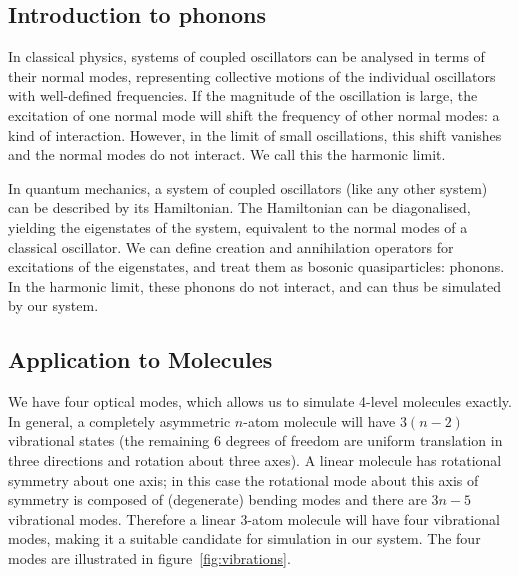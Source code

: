 \subsection{Introduction to phonons}
\label{sec:Phonons}
In classical physics, systems of coupled oscillators can be analysed in terms of
their normal modes, representing collective motions of the individual
oscillators with well-defined frequencies. If the magnitude of the oscillation
is large, the excitation of one normal mode will shift the frequency of other
normal modes: a kind of interaction. However, in the limit of small
oscillations, this shift vanishes and the normal modes do not interact. We call
this the harmonic limit.

In quantum mechanics, a system of coupled oscillators (like any other system)
can be described by its Hamiltonian. The Hamiltonian can be diagonalised,
yielding the eigenstates of the system, equivalent to the normal modes of a
classical oscillator. We can define creation and annihilation operators for
excitations of the eigenstates, and treat them as bosonic quasiparticles:
phonons. In the harmonic limit, these phonons do not interact, and can thus be
simulated by our system.

\subsection{Application to Molecules}
We have four optical modes, which allows us to simulate 4-level molecules
exactly. In general, a completely asymmetric \(n\)-atom molecule will have \(3
\left(n-2\right)\) vibrational states (the remaining 6 degrees of freedom are
uniform translation in three directions and rotation about three axes). A linear
molecule has rotational symmetry about one axis; in this case the rotational
mode about this axis of symmetry is composed of (degenerate) bending modes and
there are \(3n - 5\) vibrational modes. Therefore a linear 3-atom molecule will
have four vibrational modes, making it a suitable candidate for simulation in
our system. The four modes are illustrated in figure~\ref{fig:vibrations}.

